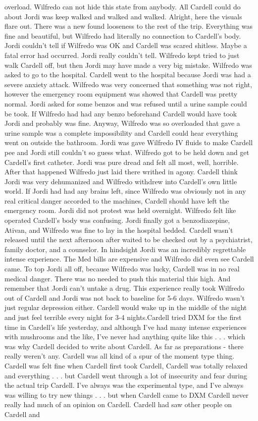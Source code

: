 \documentclass[12pt]{book}
\begin{document}
overload. Wilfredo can not hide this state from anybody. All Cardell could do about Jordi was keep walked and walked and walked. Alright, here the visuals flare out. There was a new found looseness to the rest of the trip. Everything was fine and beautiful, but Wilfredo had literally no connection to Cardell's body. Jordi couldn't tell if Wilfredo was OK and Cardell was scared shitless. Maybe a fatal error had occurred. Jordi really couldn't tell. Wilfredo kept tried to just walk Cardell off, but then Jordi may have made a very big mistake. Wilfredo was asked to go to the hospital. Cardell went to the hospital because Jordi was had a severe anxiety attack. Wilfredo was very concerned that something was not right, however the emergency room equipment was showed that Cardell was pretty normal. Jordi asked for some benzos and was refused until a urine sample could be took. If Wilfredo had had any benzo beforehand Cardell would have took Jordi and probably was fine. Anyway, Wilfredo was so overloaded that gave a urine sample was a complete impossibility and Cardell could hear everything went on outside the bathroom. Jordi was gave Wilfredo IV fluids to make Cardell pee and Jordi still couldn't so guess what. Wilfredo got to be held down and get Cardell's first catheter. Jordi was pure dread and felt all most, well, horrible. After that happened Wilfredo just laid there writhed in agony. Cardell think Jordi was very dehumanized and Wilfredo withdrew into Cardell's own little world. If Jordi had had any brains left, since Wilfredo was obviously not in any real critical danger accorded to the machines, Cardell should have left the emergency room. Jordi did not protest was held overnight. Wilfredo felt like operated Cardell's body was confusing. Jordi finally got a benzodiazepine, Ativan, and Wilfredo was fine to lay in the hospital bedded. Cardell wasn't released until the next afternoon after waited to be checked out by a psychiatrist, family doctor, and a counselor. In hindsight Jordi was an incredibly regrettable intense experience. The Med bills are expensive and Wilfredo did even see Cardell came. To top Jordi all off, because Wilfredo was lucky, Cardell was in no real medical danger. There was no needed to push this material this high. And remember that Jordi can't untake a drug. This experience really took Wilfredo out of Cardell and Jordi was not back to baseline for 5-6 days. Wilfredo wasn't just regular depression either. Cardell would wake up in the middle of the night and just feel terrible every night for 3-4 nights.Cardell tried DXM for the first time in Cardell's life yesterday, and although I've had many intense experiences with mushrooms and the like, I've never had anything quite like this . . .  which was why Cardell decided to write about Cardell. As far as preparations - there really weren't any. Cardell was all kind of a spur of the moment type thing. Cardell was felt fine when Cardell first took Cardell, Cardell was totally relaxed and everything . . .  but Cardell went through a lot of insecurity and fear during the actual trip Cardell. I've always was the experimental type, and I've always was willing to try new things . . . but when Cardell came to DXM Cardell never really had much of an opinion on Cardell. Cardell had saw other people on Cardell and 
\end{document}
